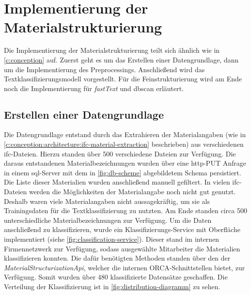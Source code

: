 \section{Implementierung der Materialstrukturierung}
\label{c:implementation:structuring}
Die Implementierung der Materialstrukturierung teilt sich ähnlich wie in \autoref{c:conception} auf. Zuerst geht es um das Erstellen einer Datengrundlage, dann um die Implementierung des Preprocessings. Anschließend wird das Textklassifizierungsmodell vorgestellt. Für die Feinstrukturierung wird am Ende noch die Implementierung für \textit{fastText} und \ac{dbscan} erläutert.
\subsection{Erstellen einer Datengrundlage}
\label{c:implementation:data} 
Die Datengrundlage entstand durch das Extrahieren der Materialangaben (wie in \autoref{c:conception:architecture:ifc-material-extraction} beschrieben) aus verschiedenen \ac{ifc}-Dateien. Hierzu standen über 500 verschiedene Dateien zur Verfügung. Die daraus entstandenen Materialbezeichnungen wurden über eine \ac{http}-PUT Anfrage in einem \ac{sql}-Server mit dem in \autoref{fig:db-scheme} abgebildetem Schema persistiert. Die Liste dieser Materialien wurden anschließend manuell gefiltert. In vielen \ac{ifc}-Dateien werden die Möglichkeiten der Materialangabe noch nicht gut genutzt. Deshalb waren viele Materialangaben nicht aussagekräftig, um sie als Trainingsdaten für die Textklassifizierung zu nutzten. Am Ende standen circa 500 unterschiedliche Materialbezeichnungen zur Verfügung.
Um die Daten anschließend zu klassifizieren, wurde ein Klassifizierungs-Service mit Oberfläche implementiert (siehe  \autoref{fig:classification-service}). Dieser stand im internen Firmennetzwerk zur Verfügung, sodass ausgewählte Mitarbeiter die Materialien klassifizieren konnten. Die dafür benötigten Methoden standen über den  der \textit{MaterialStructurizationApi}, welcher die internen ORCA-Schnittstellen bietet, zur Verfügung. Somit wurden über 480 klassifizierte Datensätze geschaffen. Die Verteilung der Klassifizierung ist in \autoref{fig:distribution-diagramm} zu sehen.

